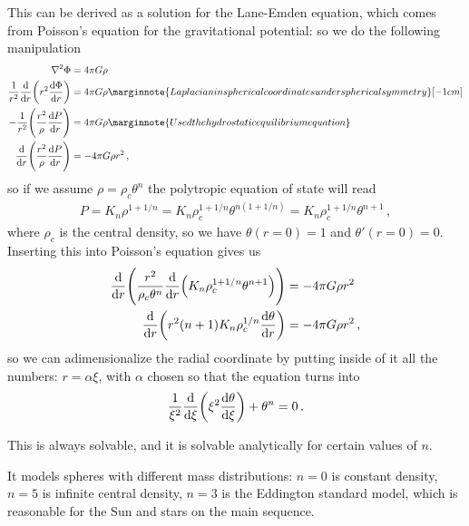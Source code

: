 \documentclass[main.tex]{subfiles}
\begin{document}
\begin{bluebox}
This can be derived as a solution for the Lane-Emden equation, which comes from Poisson's equation for the gravitational potential: so we do the following manipulation 
%
\begin{subequations}
\begin{align}
\nabla^2 \Phi  &= 4 \pi G \rho  \\
\frac{1}{r^2} \dv{}{r} \qty(r^2 \dv{\Phi }{r}) &= 4 \pi G \rho  \marginnote{Laplacian in spherical coordinates under spherical symmetry}[-1cm]\\
-\frac{1}{r^2}\qty(\frac{r^2}{\rho } \dv{P}{r}) &= 4 \pi G \rho   \marginnote{Used the hydrostatic equilibrium equation}\\
\dv{}{r} \qty(\frac{r^2}{\rho } \dv{P}{r}) &= - 4 \pi G \rho r^2
\,,
\end{align}
\end{subequations}
%
so if we assume \(\rho = \rho_{c} \theta^{n}\) the polytropic equation of state will read 
%
\begin{align}
P = K_n \rho^{1 + 1/n} = K_n \rho_{c}^{1 + 1/n} \theta^{n (1 + 1/n)}
= K_n \rho_{c}^{1 + 1/n} \theta^{n+1}
\,,
\end{align}
%
where \(\rho_{c}\) is the central density, so we have \(\theta (r=0) = 1\) and \(\theta' (r=0) =0\). Inserting this into Poisson's equation gives us 
%
\begin{subequations}
\begin{align}
\dv{}{r} \qty(\frac{r^2}{\rho_{c} \theta^{n}}
\dv{}{r} \qty(K_{n} \rho_{c}^{1 + 1/n} \theta^{n+1})) &=-4 \pi G \rho r^2  \\
\dv{}{r} \qty(r^2 (n+1) K_n \rho_{c}^{1/n} \dv{\theta }{r}) & = - 4 \pi G \rho r^2
\,,
\end{align}
\end{subequations}
%
so we can adimensionalize the radial coordinate by putting inside of it all the numbers: \(r = \alpha \xi \), with \(\alpha \) chosen so that the equation turns into
%
\begin{align}
\frac{1}{\xi^2} \dv{}{\xi } \qty(\xi^2 \dv{\theta }{\xi })
+ \theta^{n} = 0
\,.
\end{align}

This is always solvable, and it is solvable analytically for certain values of \(n\). 

\end{bluebox}

It models spheres with different mass distributions:
\(n=0\) is constant density, \(n=5\) is infinite central density, \(n=3\) is the Eddington standard model, which is reasonable for the Sun and stars on the main sequence.
\end{document}
